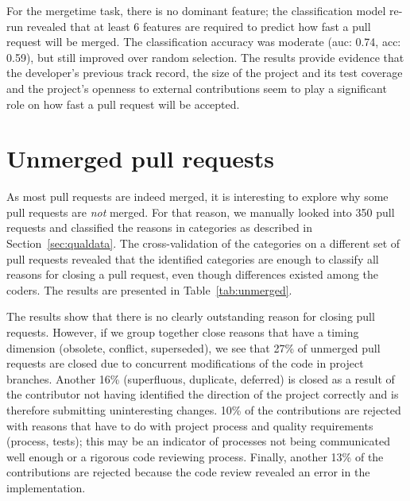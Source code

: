 \documentclass{sig-alternate}
\begin{document}
For the \textsf{mergetime} task, there is no dominant feature; the
classification model re-run revealed that at least 6 features are required to
predict how fast a pull request will be merged. The classification accuracy was
moderate ({\sc auc:} 0.74, {\sc acc}: 0.59), but still improved over random
selection. The results provide evidence that the developer's previous
track record, the size of the project and its test coverage and the project's
openness to external contributions seem to play a significant role on
how fast a pull request will be accepted.


\noindent {}

\section{Unmerged pull requests}

As most pull requests are indeed merged, it is interesting to explore why some
pull requests are \emph{not} merged. For that reason, we manually looked into 350 pull
requests and classified the reasons in categories as described in
Section~\ref{sec:qualdata}. The cross-validation of the categories on a
different set of pull requests revealed that the identified categories are
enough to classify all reasons for closing a pull request, even though
differences existed among the coders.  The results are presented in
Table~\ref{tab:unmerged}. 

The results show that there is no clearly outstanding reason for closing pull
requests. However, if we group together close reasons that have a timing
dimension (\textsf{obsolete}, \textsf{conflict}, \textsf{superseded}), we see
that 27\% of unmerged pull requests are closed due to concurrent modifications
of the code in project branches. Another 16\% (\textsf{superfluous},
\textsf{duplicate}, \textsf{deferred}) is closed as a result of the contributor
not having identified the direction of the project correctly and is therefore
submitting uninteresting changes. 10\% of the contributions are rejected with
reasons that have to do with project process and quality requirements
(\textsf{process}, \textsf{tests}); this may
be an indicator of processes not being communicated well enough or a rigorous
code reviewing process. Finally, another 13\% of the contributions are
rejected because the code review revealed an error in the implementation.
\end{document}
